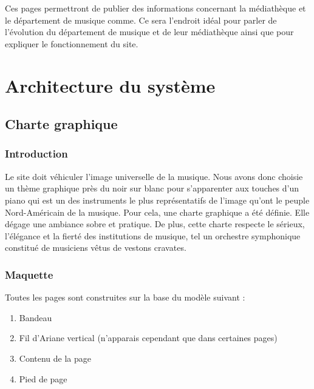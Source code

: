 \documentclass[letter, 11pt]{report}
\begin{document}
Ces pages permettront de publier des informations concernant la médiathèque et le département de musique comme. Ce sera l'endroit idéal pour parler de l'évolution du département de musique et de leur médiathèque ainsi que pour expliquer le fonctionnement du site.

\chapter{Architecture du système}

\section{Charte graphique}

\subsection{Introduction}

Le site doit véhiculer l'image universelle de la musique. Nous avons donc choisie un thème graphique près du noir sur blanc pour s'apparenter aux touches d'un piano qui est un des instruments le plus représentatifs de l'image qu'ont le peuple Nord-Américain de la musique. Pour cela, une charte graphique a été définie. Elle dégage une ambiance sobre et pratique. De plus, cette charte respecte le sérieux, l'élégance et la fierté des institutions de musique, tel un orchestre symphonique constitué de musiciens vêtus de vestons cravates.

\subsection{Maquette}

Toutes les pages sont construites sur la base du modèle suivant :

\begin{enumerate}
	\item Bandeau
	\item Fil d'Ariane vertical (n'apparais cependant que dans certaines pages)
	\item Contenu de la page
	\item Pied de page
\end{enumerate}
\end{document}
